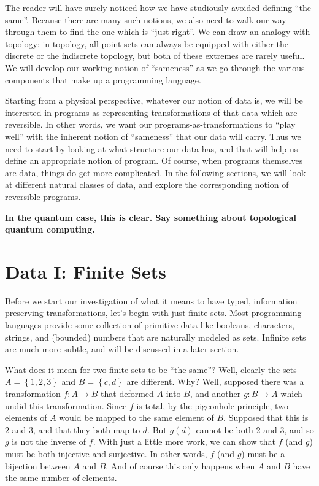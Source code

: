 \documentclass{article}
\newcommand{\amr}[1]{\fbox{Amr says:} \textbf{#1}}
\begin{document}
The reader will have surely noticed how we have studiously avoided
defining ``the same''. Because there are many such notions, we
also need to walk our way through them to find the one which is
``just right''. We can draw an analogy with topology: in topology,
all point sets can always be equipped with either the discrete or
the indiscrete topology, but both of these extremes are rarely
useful. We will develop our working notion of ``sameness''
as we go through the various components that make up a
programming language.

Starting from a physical perspective, whatever our notion of data
is, we will be interested in programs as representing transformations
of that data which are reversible. In other words, we want our
programs-as-transformations to ``play well'' with the inherent notion
of ``sameness'' that our data will carry. Thus we need to start by
looking at what structure our data has, and that will help us define
an appropriate notion of program. Of course, when programs themselves
are data, things do get more complicated.  In the following sections,
we will look at different natural classes of data, and explore the
corresponding notion of reversible programs.

\amr{In the quantum case, this is clear. Say something about topological
quantum computing.}

\section{Data I: Finite Sets}

Before we start our investigation of what it means to have typed,
information preserving transformations, let's begin with just
finite sets. Most programming languages provide some collection of primitive
data like booleans, characters, strings, and (bounded) numbers that are
naturally modeled as sets. Infinite sets are much more subtle, and will be
discussed in a later section.

What does it mean for two finite sets to be ``the same''?  Well, clearly the
sets $A = \left\{1, 2, 3\right\}$ and $B = \left\{c, d\right\}$ are different.
Why?  Well, supposed there was a transformation $f : A \rightarrow B$ that
deformed $A$ into $B$, and another $g : B \rightarrow A$ which undid this
transformation. Since $f$ is total, by the pigeonhole principle, two elements
of $A$ would be mapped to the same element of $B$. Supposed that this is $2$ and
$3$, and that they both map to $d$.  But $g(d)$ cannot be both $2$ and $3$, and
so $g$ is not the inverse of $f$. With just a little more work, we can show
that $f$ (and $g$) must be both injective and surjective. In other words,
$f$ (and $g$) must be a bijection between $A$ and $B$.  And of course this 
only happens when $A$ and $B$ have the same number of elements.
\end{document}
